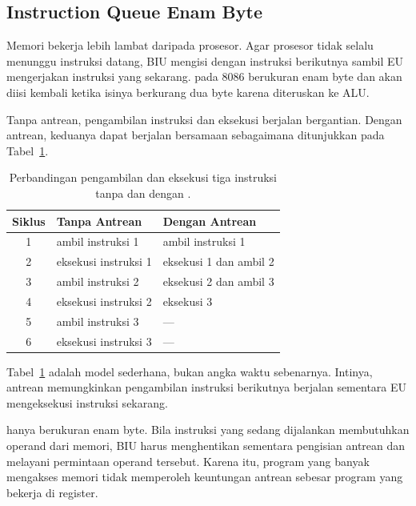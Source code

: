 \subsection{Instruction Queue Enam Byte}

Memori bekerja lebih lambat daripada prosesor. Agar prosesor tidak
selalu menunggu instruksi datang, BIU mengisi  dengan
instruksi berikutnya sambil EU mengerjakan instruksi yang sekarang.
 pada 8086 berukuran enam byte dan akan diisi kembali
ketika isinya berkurang dua byte karena diteruskan ke ALU.

Tanpa antrean, pengambilan instruksi dan eksekusi berjalan
bergantian. Dengan antrean, keduanya dapat berjalan bersamaan
sebagaimana ditunjukkan pada Tabel~\ref{tab:queue}.

\begin{table}[H]
    \centering
    \caption{Perbandingan pengambilan dan eksekusi tiga instruksi
    tanpa dan dengan .}
    \label{tab:queue}
    \small
    \begin{tabular}{@{}cll@{}}
        \toprule
        \textbf{Siklus} & \textbf{Tanpa Antrean} &
        \textbf{Dengan Antrean} \\
        \midrule
        1 & ambil instruksi 1 & ambil instruksi 1 \\
        2 & eksekusi instruksi 1 & eksekusi 1 dan ambil 2 \\
        3 & ambil instruksi 2 & eksekusi 2 dan ambil 3 \\
        4 & eksekusi instruksi 2 & eksekusi 3 \\
        5 & ambil instruksi 3 & --- \\
        6 & eksekusi instruksi 3 & --- \\
        \bottomrule
    \end{tabular}
\end{table}

Tabel~\ref{tab:queue} adalah model sederhana, bukan angka waktu
sebenarnya. Intinya, antrean memungkinkan pengambilan instruksi
berikutnya berjalan sementara EU mengeksekusi instruksi sekarang.

\begin{peringatanbox}
\vspace{1.1em}
 hanya berukuran enam byte. Bila instruksi yang sedang
dijalankan membutuhkan operand dari memori, BIU harus menghentikan
sementara pengisian antrean dan melayani permintaan operand tersebut.
Karena itu, program yang banyak mengakses memori tidak memperoleh
keuntungan antrean sebesar program yang bekerja di register.
\end{peringatanbox}


